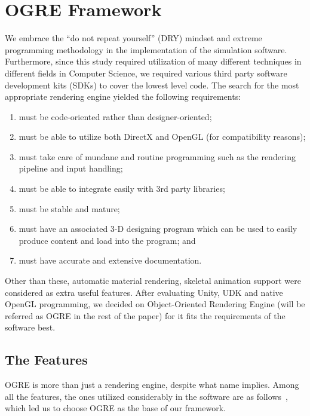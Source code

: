 \appendix
\chapter{OGRE Framework}
\label{appendix_ogre_framework}

We embrace the ``do not repeat yourself'' (DRY) mindset and extreme programming methodology in the implementation of the simulation software. Furthermore, since this study required utilization of many different techniques in different fields in Computer Science, we required various third party software development kits (SDKs) to cover the lowest level code. The search for the most appropriate rendering engine yielded the following requirements:

\begin{enumerate}
\item must be code-oriented rather than designer-oriented;
\item must be able to utilize both DirectX and OpenGL (for compatibility reasons);
\item must take care of mundane and routine programming such as the rendering pipeline and input handling;
\item must be able to integrate easily with 3rd party libraries;
\item must be stable and mature;
\item must have an associated 3-D designing program which can be used to easily produce content and load into the program; and
\item must have accurate and extensive documentation.
\end{enumerate}

Other than these, automatic material rendering, skeletal animation support were considered as extra useful features. After evaluating Unity, UDK and native OpenGL programming, we decided on Object-Oriented Rendering Engine (will be referred as OGRE in the rest of the paper) for it fits the requirements of the software best.


\section{The Features}
OGRE is more than just a rendering engine, despite what name implies. Among all the features, the ones utilized considerably in the software are as follows~\cite{Knot2012}, which led us to choose OGRE as the base of our framework.

